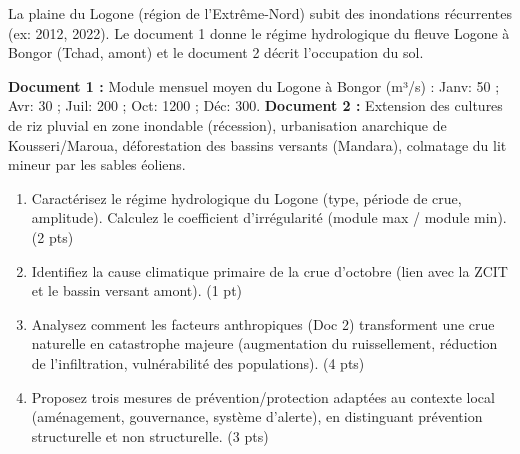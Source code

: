 \documentclass[11pt]{article}
\begin{document}
\begin{exercice}
\label{exo:inondations_logone}
La plaine du Logone (région de l'Extrême-Nord) subit des inondations récurrentes (ex: 2012, 2022). Le document 1 donne le régime hydrologique du fleuve Logone à Bongor (Tchad, amont) et le document 2 décrit l'occupation du sol.

\textbf{Document 1 :} Module mensuel moyen du Logone à Bongor (m³/s) : Janv: 50 ; Avr: 30 ; Juil: 200 ; Oct: 1200 ; Déc: 300.
\textbf{Document 2 :} Extension des cultures de riz pluvial en zone inondable (récession), urbanisation anarchique de Kousseri/Maroua, déforestation des bassins versants (Mandara), colmatage du lit mineur par les sables éoliens.

\begin{enumerate}
    \item Caractérisez le régime hydrologique du Logone (type, période de crue, amplitude). Calculez le coefficient d'irrégularité (module max / module min). \hfill (2 pts)
    \item Identifiez la cause climatique primaire de la crue d'octobre (lien avec la ZCIT et le bassin versant amont). \hfill (1 pt)
    \item Analysez comment les facteurs anthropiques (Doc 2) transforment une crue naturelle en catastrophe majeure (augmentation du ruissellement, réduction de l'infiltration, vulnérabilité des populations). \hfill (4 pts)
    \item Proposez trois mesures de prévention/protection adaptées au contexte local (aménagement, gouvernance, système d'alerte), en distinguant prévention structurelle et non structurelle. \hfill (3 pts)
\end{enumerate}
\end{exercice}
\end{document}

